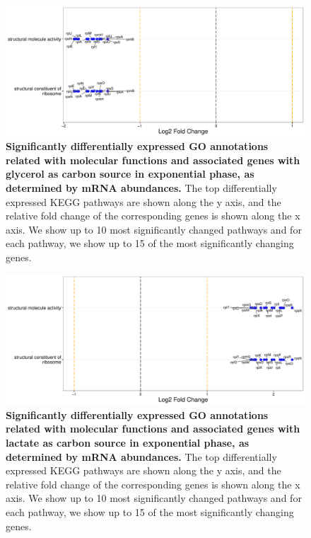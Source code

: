 \documentclass[a4paper]{article}
\begin{document}
\begin{figure}[!htb]
	\includegraphics[width=1.0\textwidth]{../../d_figures/mf_n_01.pdf}
	\caption[Significantly altered GO annotations associated with molecular functions for mRNA samples in exponential phase tested for glycerol against glucose]
	{\textbf{Significantly differentially expressed GO annotations related with molecular functions and associated genes with glycerol as carbon source in exponential phase, as determined by mRNA abundances.} The top differentially expressed KEGG pathways are shown along the y axis, and the relative fold change of the corresponding genes is shown along the x axis. We show up to 10 most significantly changed pathways and for each pathway, we show up to 15 of the most significantly changing genes.}
\end{figure}

\clearpage
\begin{figure}
	\includegraphics[width=1.0\textwidth]{../../d_figures/mf_n_02.pdf}
	\caption[Significantly altered GO annotations associated with molecular functions for mRNA samples in exponential phase tested for lactate against glucose]
	{\textbf{Significantly differentially expressed GO annotations related with molecular functions and associated genes with lactate as carbon source in exponential phase, as determined by mRNA abundances.} The top differentially expressed KEGG pathways are shown along the y axis, and the relative fold change of the corresponding genes is shown along the x axis. We show up to 10 most significantly changed pathways and for each pathway, we show up to 15 of the most significantly changing genes.}
\end{figure}
\end{document}
